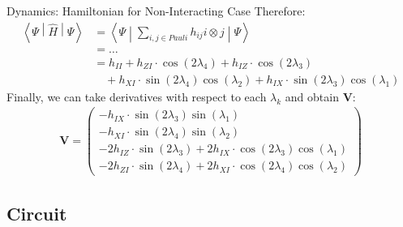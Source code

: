 \documentclass[professionalfonts]{beamer}
\newcommand{\sandwich}[3]{\left< #1 \middle\vert #2 \middle\vert #3 \right>}
\newcommand{\s}[1]{\sin\left( #1 \right)}
\newcommand{\co}[1]{\cos\left( #1 \right)}
\begin{document}

\begin{frame}{Dynamics: Hamiltonian for Non-Interacting Case}
Therefore:
	\begin{align*}
		\sandwich \Psi {\hat H} \Psi
		&= \sandwich {\Psi} {
			\sum_{i, j \in Pauli}
			h_{ij} i \otimes j
		} {\Psi}
%
	\\ &= \ldots \\
%
		&=	h_{II}
		+	h_{ZI} \cdot \co {2 \lambda_4}
		+	h_{IZ} \cdot \co {2 \lambda_3}
%
	\\
	&\quad
%
		+	h_{XI} \cdot \s  {2 \lambda_4} \co {\lambda_2}
		+	h_{IX} \cdot \s  {2 \lambda_3} \co {\lambda_1}
	\end{align*} %
%
Finally, we can take derivatives with respect to each $\lambda_k$ and obtain $\bm V$:
%
\begin{equation*}
	\begin{split}
		\bm V = \begin{pmatrix}
		-	h_{IX} \cdot \s  {2 \lambda_3} \s  {\lambda_1}
%
	\\
		-	h_{XI} \cdot \s  {2 \lambda_4} \s  {\lambda_2}
%
	\\
%
%
		-	2 h_{IZ} \cdot \s  {2 \lambda_3}
		+	2 h_{IX} \cdot \co {2 \lambda_3} \co {\lambda_1}
%
	\\
%
		-	2 h_{ZI} \cdot \s  {2 \lambda_4}
		+	2 h_{XI} \cdot \co {2 \lambda_4} \co {\lambda_2}
		\end{pmatrix}
	\end{split}
\end{equation*}
\end{frame}


\subsection {\textbf{Circuit}}
\end{document}
